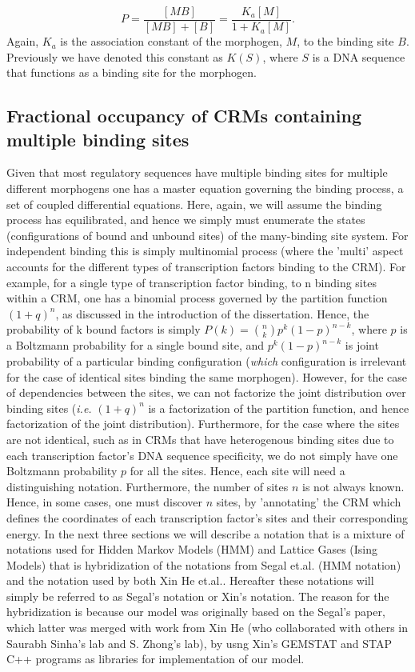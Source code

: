 \begin{equation}\label{}
    P =\frac{[MB]}{[MB] + [B]} = \frac{K_{a}[M]}{1+K_{a}[M]}.
\end{equation}
Again, $K_a$ is the association constant of the morphogen, $M$, to the binding site $B$.  Previously we have denoted this constant as $K(S)$, where $S$ is a DNA sequence that functions as a binding site for the morphogen. 

\subsection{Fractional occupancy of CRMs containing multiple binding sites }


Given that most regulatory sequences have multiple binding sites for multiple different morphogens one has a master equation governing the binding process, a set of coupled differential equations.  Here, again, we will assume the binding process has equilibrated, and hence we simply must enumerate the states (configurations of bound and unbound sites) of the many-binding site system.  For independent binding this is simply multinomial process (where the 'multi' aspect accounts for the different types of transcription factors binding to the CRM).  For example, for a single type of transcription factor binding, to n binding sites within a CRM, one has a binomial process governed by the partition function $(1+q)^n$, as discussed in the introduction of the dissertation.  Hence, the probability of k bound factors is simply $P(k) =  {n \choose k}p^k(1-p)^{n-k}$, where $p$ is a Boltzmann probability for a single bound site, and $p^k(1-p)^{n-k}$ is joint probability of a particular binding configuration (\emph{which} configuration is irrelevant for the case of identical sites binding the same morphogen).  However, for the case of dependencies between the sites, we can not factorize the joint distribution over binding sites (\textit{i.e.} $(1+q)^n$ is a factorization of the partition function, and hence factorization of the joint distribution).  Furthermore, for the case where the sites are not identical, such as in CRMs that have heterogenous binding sites due to each transcription factor's DNA sequence specificity, we do not simply have one Boltzmann probability $p$ for all the sites.  Hence, each site will need a distinguishing notation.  Furthermore, the number of sites $n$ is not always known.  Hence, in some cases, one must discover $n$ sites, by 'annotating' the CRM which defines the coordinates of each transcription factor's sites and their corresponding energy.  In the next three sections we will describe a notation that is a mixture of notations used for Hidden Markov Models (HMM) and Lattice Gases (Ising Models) that is hybridization of the notations from Segal et.al.\cite{pmid18172436} (HMM notation) and the notation used by both Xin He et.al.\cite{pmid20862354}\cite{pmid19956545}.  Hereafter these notations will simply be referred to as Segal's notation or Xin's notation.  The reason for the hybridization is because our model was originally based on the Segal's paper, which latter was merged with work from Xin He (who collaborated with others in Saurabh Sinha's lab and S. Zhong's lab), by usng Xin's GEMSTAT and STAP C++ programs as libraries for implementation of our model.


